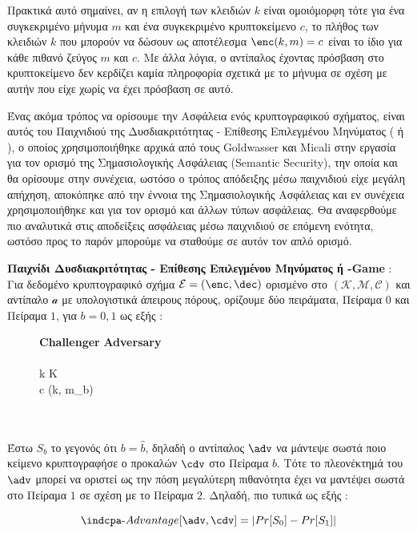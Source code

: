 Πρακτικά αυτό σημαίνει, αν η επιλογή των κλειδιών $k$ είναι ομοιόμορφη τότε για ένα συγκεκριμένο μήνυμα $m$ και ένα συγκεκριμένο κρυπτοκείμενο $c$, το πλήθος των κλειδιών $k$ που μπορούν να δώσουν ως αποτέλεσμα $\enc(k,m) = c$ είναι το ίδιο για κάθε πιθανό ζεύγος $m$ και $c$. Με άλλα λόγια, ο αντίπαλος έχοντας πρόσβαση στο κρυπτοκείμενο δεν κερδίζει καμία πληροφορία σχετικά με το μήνυμα σε σχέση με αυτήν που είχε χωρίς να έχει πρόσβαση σε αυτό.

Ένας ακόμα τρόπος να ορίσουμε την Ασφάλεια ενός κρυπτογραφικού σχήματος, είναι αυτός του Παιχνιδιού της Δυσδιακριτότητας - Επίθεσης Επιλεγμένου Μηνύματος ( ή \indcpa), ο οποίος χρησιμοποιήθηκε αρχικά από τους Goldwasser και Micali στην εργασία \cite{10.1145/800070.802212} για τον ορισμό της Σημασιολογικής Ασφάλειας (Semantic Security), την οποία και θα ορίσουμε στην συνέχεια, ωστόσο ο τρόπος απόδειξης μέσω παιχνιδιού είχε μεγάλη απήχηση, αποκόπηκε από την έννοια της Σημασιολογικής Ασφάλειας και εν συνέχεια χρησιμοποιήθηκε και για τον ορισμό και άλλων τύπων ασφάλειας. Θα αναφερθούμε πιο αναλυτικά στις αποδείξεις ασφάλειας μέσω παιχνιδιού σε επόμενη ενότητα, ωστόσο προς το παρόν μπορούμε να σταθούμε σε αυτόν τον απλό ορισμό.

\begin{definition}
\textbf{Παιχνίδι Δυσδιακριτότητας - Επίθεσης Επιλεγμένου Μηνύματος ή \indcpa-Game } : Για δεδομένο κρυπτογραφικό σχήμα $\mathcal{E}=(\enc,\dec)$ ορισμένο στο $(\mathcal{K}, \mathcal{M}, \mathcal{C})$ και αντίπαλο $\mathcal{a}$ με υπολογιστικά άπειρους πόρους, ορίζουμε δύο πειράματα, Πείραμα $0$ και Πείραμα $1$, για $b=0,1$ ως εξής :

\begin{figure}[H]
\begin{pchstack}
     {
    \textbf{Challenger \cdv} \< \< \textbf{Adversary \adv} \\
    \<  \< \\
    k \sample K \< \< \\
    c \sample \enc(k, m_b) \< \< \\
    \<  \< \\
    \< \\
    }
\end{pchstack}
\label{fig:ind_game1}
\end{figure}

Έστω $S_b$ το γεγονός ότι $b = \hat{b}$, δηλαδή ο αντίπαλος $\adv$ να μάντεψε σωστά ποιο κείμενο κρυπτογραφήσε ο προκαλών $\cdv$ στο Πείραμα $b$. Τότε το πλεονέκτημά του $\adv$ μπορεί να οριστεί ως την πόση μεγαλύτερη πιθανότητα έχει να μαντέψει σωστά στο Πείραμα $1$ σε σχέση με το Πείραμα $2$. Δηλαδή, πιο τυπικά ως εξής :

\begin{equation}
    \indcpa\text{-}Advantage[\adv, \cdv] = | Pr[S_0] - Pr[S_1] |
\end{equation}
\end{definition}

